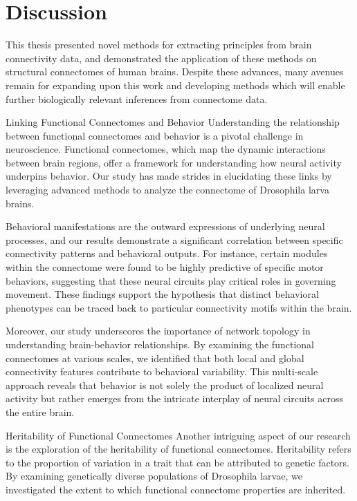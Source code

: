 \chapter{Discussion}\label{chap:discussion}

This thesis presented novel methods for extracting principles from brain connectivity data, and demonstrated the application of these methods on structural connectomes of human brains. Despite these advances, many avenues remain for expanding upon this work and developing methods which will enable further biologically relevant inferences from connectome data.

Linking Functional Connectomes and Behavior
Understanding the relationship between functional connectomes and behavior is a pivotal challenge in neuroscience. Functional connectomes, which map the dynamic interactions between brain regions, offer a framework for understanding how neural activity underpins behavior. Our study has made strides in elucidating these links by leveraging advanced methods to analyze the connectome of Drosophila larva brains.

Behavioral manifestations are the outward expressions of underlying neural processes, and our results demonstrate a significant correlation between specific connectivity patterns and behavioral outputs. For instance, certain modules within the connectome were found to be highly predictive of specific motor behaviors, suggesting that these neural circuits play critical roles in governing movement. These findings support the hypothesis that distinct behavioral phenotypes can be traced back to particular connectivity motifs within the brain.

Moreover, our study underscores the importance of network topology in understanding brain-behavior relationships. By examining the functional connectomes at various scales, we identified that both local and global connectivity features contribute to behavioral variability. This multi-scale approach reveals that behavior is not solely the product of localized neural activity but rather emerges from the intricate interplay of neural circuits across the entire brain.

Heritability of Functional Connectomes
Another intriguing aspect of our research is the exploration of the heritability of functional connectomes. Heritability refers to the proportion of variation in a trait that can be attributed to genetic factors. By examining genetically diverse populations of Drosophila larvae, we investigated the extent to which functional connectome properties are inherited.

